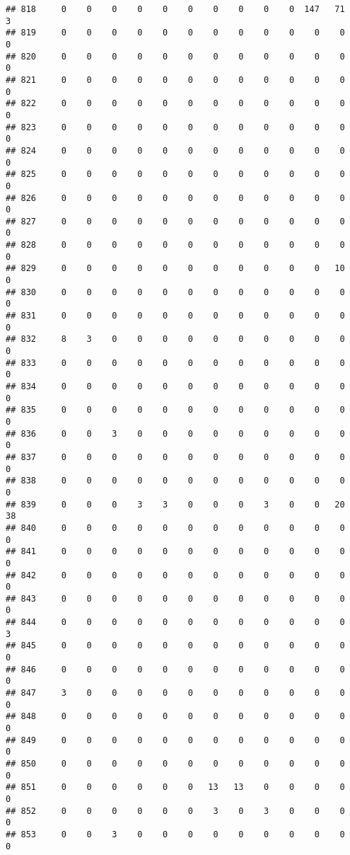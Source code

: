 \documentclass[]{article}
\begin{document}
\begin{verbatim}
## 818     0    0    0    0    0    0    0    0    0    0  147   71    3
## 819     0    0    0    0    0    0    0    0    0    0    0    0    0
## 820     0    0    0    0    0    0    0    0    0    0    0    0    0
## 821     0    0    0    0    0    0    0    0    0    0    0    0    0
## 822     0    0    0    0    0    0    0    0    0    0    0    0    0
## 823     0    0    0    0    0    0    0    0    0    0    0    0    0
## 824     0    0    0    0    0    0    0    0    0    0    0    0    0
## 825     0    0    0    0    0    0    0    0    0    0    0    0    0
## 826     0    0    0    0    0    0    0    0    0    0    0    0    0
## 827     0    0    0    0    0    0    0    0    0    0    0    0    0
## 828     0    0    0    0    0    0    0    0    0    0    0    0    0
## 829     0    0    0    0    0    0    0    0    0    0    0   10    0
## 830     0    0    0    0    0    0    0    0    0    0    0    0    0
## 831     0    0    0    0    0    0    0    0    0    0    0    0    0
## 832     8    3    0    0    0    0    0    0    0    0    0    0    0
## 833     0    0    0    0    0    0    0    0    0    0    0    0    0
## 834     0    0    0    0    0    0    0    0    0    0    0    0    0
## 835     0    0    0    0    0    0    0    0    0    0    0    0    0
## 836     0    0    3    0    0    0    0    0    0    0    0    0    0
## 837     0    0    0    0    0    0    0    0    0    0    0    0    0
## 838     0    0    0    0    0    0    0    0    0    0    0    0    0
## 839     0    0    0    3    3    0    0    0    3    0    0   20   38
## 840     0    0    0    0    0    0    0    0    0    0    0    0    0
## 841     0    0    0    0    0    0    0    0    0    0    0    0    0
## 842     0    0    0    0    0    0    0    0    0    0    0    0    0
## 843     0    0    0    0    0    0    0    0    0    0    0    0    0
## 844     0    0    0    0    0    0    0    0    0    0    0    0    3
## 845     0    0    0    0    0    0    0    0    0    0    0    0    0
## 846     0    0    0    0    0    0    0    0    0    0    0    0    0
## 847     3    0    0    0    0    0    0    0    0    0    0    0    0
## 848     0    0    0    0    0    0    0    0    0    0    0    0    0
## 849     0    0    0    0    0    0    0    0    0    0    0    0    0
## 850     0    0    0    0    0    0    0    0    0    0    0    0    0
## 851     0    0    0    0    0    0   13   13    0    0    0    0    0
## 852     0    0    0    0    0    0    3    0    3    0    0    0    0
## 853     0    0    3    0    0    0    0    0    0    0    0    0    0

\end{verbatim}
\end{document}
